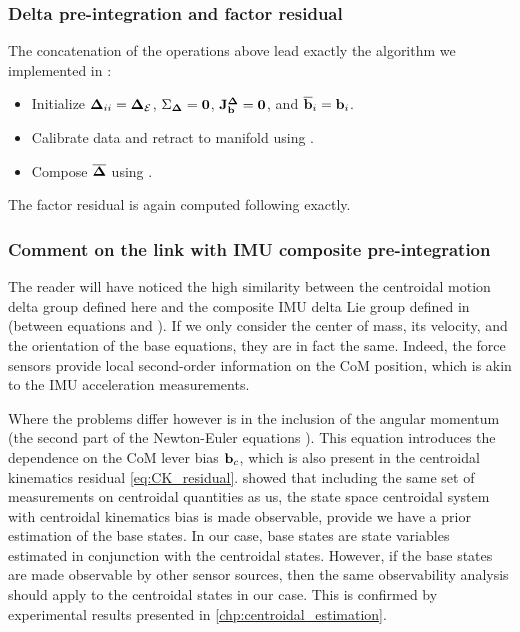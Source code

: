 \subsubsection{Delta pre-integration and factor residual}

The concatenation of the operations above lead exactly the algorithm we implemented in \cite{fourmy2021contact}:
%
\begin{itemize}
    \item Initialize ${{\bm \Delta}}_{ii} = {{\bm \Delta}}_{\mathcal{E}}$, $\Sigma_{{\bm \Delta}}=\bf0$, ${\bf J}^{{\bm \Delta}}_{\bf b} = \bf0$, and $\overline{{\bf b}}_i = {\bf b}_i$.
    \item Calibrate data and retract to manifold using .
    \item Compose $\overline{{{\bm \Delta}}}$ using .
\end{itemize}
%
The factor residual is again computed following  exactly.



\subsubsection{Comment on the link with IMU composite pre-integration}
The reader will have noticed the high similarity between the centroidal motion delta group defined here and the composite IMU delta Lie group defined 
in  (\eg between equations  and ). If we only consider the center of mass, 
its velocity, and the orientation of the base equations, they are in fact the same. 
Indeed, the force sensors provide local second-order information on the CoM position, which is akin to the IMU acceleration measurements. 

Where the problems differ however is in the inclusion of the angular momentum (the second part of the Newton-Euler equations ). This equation introduces the dependence on 
the CoM lever bias ${\bf b}_c$, which is also present in the centroidal kinematics residual \eqref{eq:CK_residual}. \cite{rotella2015humanoid} showed that including the same set of measurements on centroidal quantities as
us, the state space centroidal system with centroidal kinematics bias is made observable, provide we have a prior estimation of the base states. In our case, base states are
state variables estimated in conjunction with the centroidal states. However, if the base states are made observable by other sensor sources, then the same observability analysis
should apply to the centroidal states in our case. This is confirmed by experimental results presented in \ref{chp:centroidal_estimation}.



